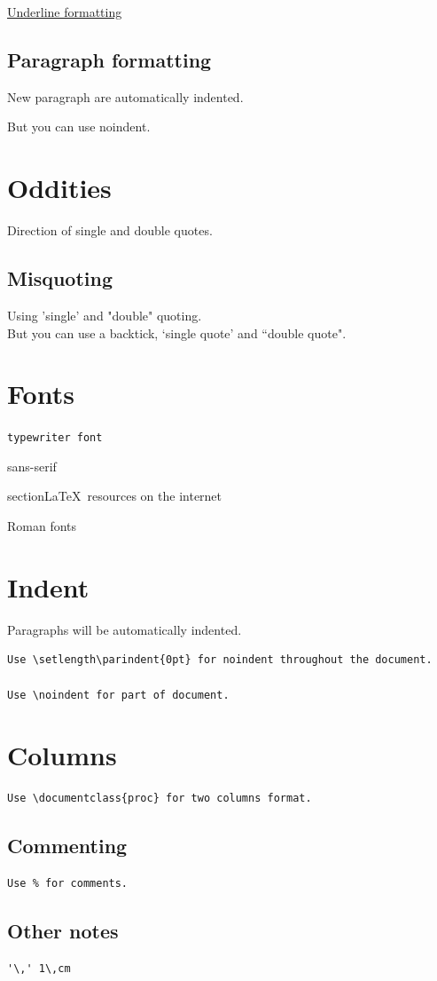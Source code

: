 \documentclass{article}
\begin{document}
\underline{Underline formatting}

\subsection{Paragraph formatting}

New paragraph are automatically indented.

\noindent But you can use noindent.

\section{Oddities}

Direction of single and double quotes.

\subsection{Misquoting}

Using 'single' and "double" quoting.
\\

\noindent But you can use a backtick, `single quote' and ``double quote".


\section{Fonts}

\texttt{typewriter font}

\textsf{sans-serif}

section{\textsf{\LaTeX\ resources on the internet}}

\textrm{Roman fonts}



\section{Indent}

Paragraphs will be automatically indented.

\begin{verbatim}
Use \setlength\parindent{0pt} for noindent throughout the document.

Use \noindent for part of document.

\end{verbatim}

\section{Columns}
\begin{verbatim}
Use \documentclass{proc} for two columns format.
\end{verbatim}

\subsection{Commenting}
\begin{verbatim}
Use % for comments.

\end{verbatim}

\subsection{Other notes}
\begin{verbatim}
'\,' 1\,cm
\end{verbatim}
\end{document}
